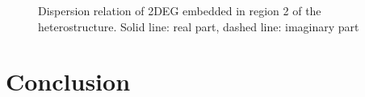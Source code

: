 \documentclass[11pt]{article}
\begin{document}
\begin{figure}[t!]
   \hfil
   \hfil
  \caption{Dispersion relation of 2DEG embedded in region 2 of the heterostructure. Solid line: real part, dashed line: imaginary part}
  \label{fig:simulation}
\end{figure}
\section{Conclusion}
%

\clearpage %
% 


\end{document}
